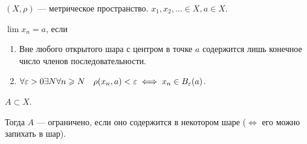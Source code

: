 \begin{definition}
    $(X, \rho)$ --- метрическое пространство.  $x_1, x_2, \ldots \in X, a \in X$.

    $\lim x_n = a$, если
     \begin{enumerate}
         \item Вне любого открытого шара с центром в точке  $a$ содержится лишь конечное число членов последовательности.
         \item  $\forall \varepsilon > 0 \exists N \forall n \geqslant N\quad \rho(x_n, a) < \varepsilon \iff x_n \in B_\varepsilon(a)$.
    \end{enumerate}
\end{definition}
\begin{definition}
    $A \subset X$. 

    Тогда  $A$ --- ограничено, если оно содержится в некотором шаре ($\iff$ его можно запихать в шар).
\end{definition}
